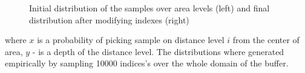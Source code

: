 \begin{figure}
	\caption{Initial distribution of the samples over area levels (left) and final distribution after modifying indexes (right)}
	\label{fig:distributions}
\end{figure}
where $x$ is a probability of picking sample on distance level $i$ from the center of area, $y$ - is a depth of the distance level. The distributions where generated empirically by sampling 10000 indices's over the whole domain of the buffer. 
